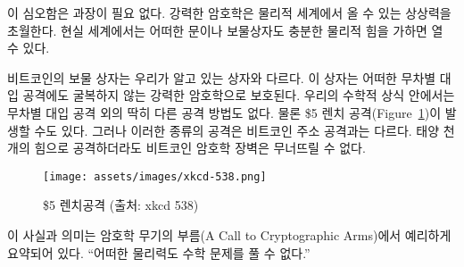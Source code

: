 \begin{comment}
It is hard to overstate the profoundness of this. Strong cryptography
inverts the power-balance of the physical world we are so used to.
Unbreakable things do not exist in the real world. Apply enough force,
and you will be able to open any door, box, or treasure chest.
\end{comment}
이 심오함은 과장이 필요 없다. 
강력한 암호학은 물리적 세계에서 올 수 있는 상상력을 초월한다.
현실 세계에서는 어떠한 문이나 보물상자도 충분한 물리적 힘을 가하면 열 수 있다.

\begin{comment}
Bitcoin's treasure chest is very different. It is secured by strong
cryptography, which does not give way to brute force. And as long as the
underlying mathematical assumptions hold, brute force is all we have.
Granted, there is also the option of a global \$5 wrench attack (Figure~\ref{fig:xkcd-538})
But torture won't work for all bitcoin addresses, and the cryptographic
walls of bitcoin will defeat brute force attacks. Even if you come at it
with the force of a thousand suns. Literally.
\end{comment}
비트코인의 보물 상자는 우리가 알고 있는 상자와 다르다. 
이 상자는 어떠한 무차별 대입 공격에도 굴복하지 않는 강력한 암호학으로 보호된다. 
우리의 수학적 상식 안에서는 무차별 대입 공격 외의 딱히 다른 공격 방법도 없다. 
물론 \$5 렌치 공격(Figure~\ref{fig:xkcd-538})이 발생할 수도 있다. 
그러나 이러한 종류의 공격은 비트코인 주소 공격과는 다르다. 
태양 천 개의 힘으로 공격하더라도 비트코인 암호학 장벽은 무너뜨릴 수 없다. 

\begin{figure}
  \centering
  \texttt{[image: assets/images/xkcd-538.png]}
  \caption{\$5 렌치공격 (출처: xkcd 538)}
  \label{fig:xkcd-538}
\end{figure}

\begin{comment}
This fact and its implications were poignantly summarized in the call
to cryptographic arms: \textit{\enquote{No amount of coercive force will ever solve
a math problem.}
\end{comment}
이 사실과 의미는 암호학 무기의 부름(A Call to Cryptographic Arms)에서 예리하게 요약되어 있다.
\enquote{어떠한 물리력도 수학 문제를 풀 수 없다.}

